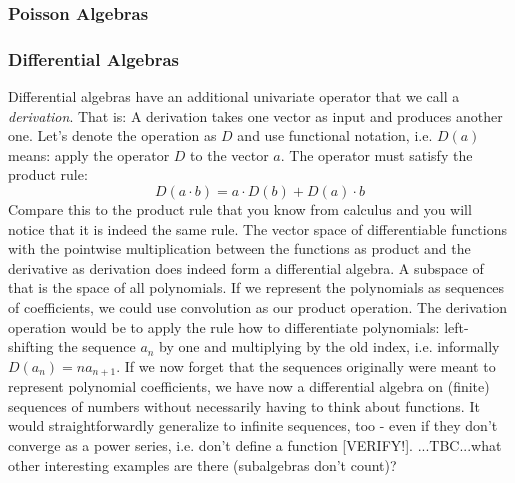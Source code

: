 




\subsubsection{Poisson Algebras} 


\subsubsection{Differential Algebras} 
Differential algebras have an additional univariate operator that we call a \emph{derivation}. That is: A derivation takes one vector as input and produces another one. Let's denote the operation as $D$ and use functional notation, i.e. $D(a)$ means: apply the operator $D$ to the vector $a$. The operator must satisfy the product rule:
\begin{equation}
D(a \cdot b) = a \cdot D(b) + D(a) \cdot b
\end{equation}
Compare this to the product rule that you know from calculus and you will notice that it is indeed the same rule. The vector space of differentiable functions with the pointwise multiplication between the functions as product and the derivative as derivation does indeed form a differential algebra. A subspace of that is the space of all polynomials. If we represent the polynomials as sequences of coefficients, we could use convolution as our product operation. The derivation operation would be to apply the rule how to differentiate polynomials: left-shifting the sequence $a_n$ by one and multiplying by the old index, i.e. informally $D(a_n) = n a_{n+1}$. If we now forget that the sequences originally were meant to represent polynomial coefficients, we have now a differential algebra on (finite) sequences of numbers without necessarily having to think about functions. It would straightforwardly generalize to infinite sequences, too - even if they don't converge as a power series, i.e. don't define a function [VERIFY!]. ...TBC...what other interesting examples are there (subalgebras don't count)? 

